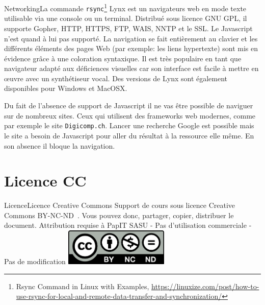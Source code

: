 \documentclass{beamer}
\begin{document}
    \begin{frame}[fragile]{Networking}{La commande \lstinline{rsync}\footnote{Rsync Command in Linux with Examples, \url{https://linuxize.com/post/how-to-use-rsync-for-local-and-remote-data-transfer-and-synchronization/}}}
        Lynx est un navigateurs web en mode texte utilisable via une console ou un terminal.
        Distribué sous licence GNU GPL, il supporte Gopher, HTTP, HTTPS, FTP, WAIS, NNTP et le SSL. Le Javascript n'est quand à lui pas supporté.
        La navigation se fait entièrement au clavier et les différents éléments des pages Web (par exemple: les liens hypertexte) sont mis en évidence grâce à une coloration syntaxique.
        Il est très populaire en tant que navigateur adapté aux déficiences visuelles car son interface est facile à mettre en œuvre avec un synthétiseur vocal.
        Des versions de Lynx sont également disponibles pour Windows et MacOSX.
        \begin{dangercolorbox}
            Du fait de l'absence de support de Javascript il ne vas être possible de naviguer sur de nombreux sites.
            Ceux qui utilisent des frameworks web modernes, comme par exemple le site \lstinline{Digicomp.ch}.
            Lancer une recherche Google est possible mais le site a besoin de Javascript pour aller du résultat à la ressource elle même.
            En son absence il bloque la navigation.
        \end{dangercolorbox}
    \end{frame}


    \section{Licence CC}\label{sec:licence}

    \begin{frame}{Licence}{Licence Creative Commons}
        Support de cours sous licence Creative Commons BY-NC-ND~.
        \bigbreak
        Vous pouvez donc, partager, copier, distribuer le document.
        \bigbreak
        Attribution requise à PapIT SASU - Pas d’utilisation commerciale - Pas de modification
        \bigbreak
        \centering
        \includegraphics[width=5cm]{image/by-nc-nd-logo}
    \end{frame}
\end{document}
